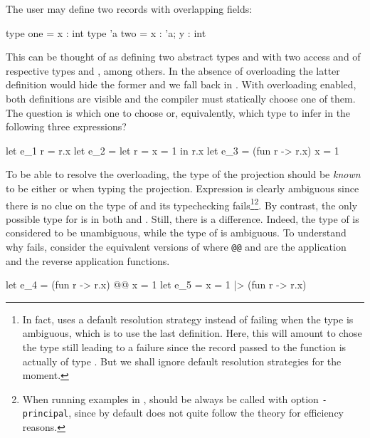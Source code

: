 \documentclass[acmsmall,screen,nonacm]{acmart}
\begin{document}
The user may define two records with overlapping fields:
\begin{program}[input]
type one = {x : int}
type 'a two = {x : 'a; y : int}
\end{program}
This can be thought of as defining two abstract types  and
 with two access  and  of
respective types  and , among
others.
%
In the absence of overloading the latter definition would hide the former
and we fall back in \ML. With overloading enabled, both definitions are
visible and the compiler must statically choose one of them.
%
The question is which one to choose or, equivalently, which type to infer
in the following three expressions? 
\begin{program}[input]
let e_1 r = r.x
let e_2 = let r = {x = 1} in r.x
let e_3 = (fun r -> r.x) {x = 1} 
\end{program}
To be able to resolve the overloading, the type of the projection should be
\emph{known} to be either  or  when typing the
projection.  Expression  is clearly ambiguous since
there is no clue on the type of  and its typechecking
fails\footnote {In fact, \OCaml uses a default resolution strategy instead
of failing when the type is ambiguous, which is to use the last
definition. Here, this will amount to chose the type 
still leading to a failure since the record passed to the function is
actually of type . But we shall ignore default resolution
strategies for the moment.}\footnote {When running examples in \OCaml,
\OCaml should be always be called with option \texttt{-principal}, since by
default \OCaml does not quite follow the theory for efficiency reasons.}.
%
By contrast, the only possible
type for  is  in both  and .
Still, there is a difference.  Indeed, the type of  is considered
to be unambiguous, while the type of  is ambiguous. To
understand why  fails, consider the equivalent versions of
 where \texttt{@@} and \ocaml{|>} are the application and the
reverse application functions.
\begin{program}[input,escapechar={}]
let e_4 = (fun r -> r.x) @@ {x = 1} 
let e_5 = {x = 1} |> (fun r -> r.x) 
\end{program}
\end{document}
